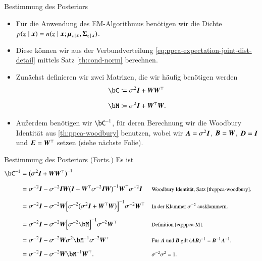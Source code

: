 \begin{frame}{Bestimmung des Posteriors}{}
	\begin{itemize}
		\item Für die Anwendung des EM-Algorithmus benötigen wir die Dichte
			$p(\bm{z} \mid \bm{x}) = n(\bm{z} \mid \bm{x}; \bm{\mu}_{\bm{z}\,\mid\,\bm{x}}, \bm{\Sigma}_{\bm{z}\,\mid\,\bm{x}})$.
		\item Diese können wir aus der Verbundverteilung \eqref{eq:ppca-expectation-joint-dist-detail}
			mittels Satz \ref{th:cond-norm} berechnen.
		\item Zunächst definieren wir zwei Matrizen, die wir häufig benötigen werden
		\begin{align}
		\label{eq:ppca-C}
			\bC
				&\coloneqq \sigma^2 \bI + \bW \bW^\top
		\\[2mm]
		\label{eq:ppca-M}
			\bM
				&\coloneqq \sigma^2 \bI + \bW^\top \bW.
		\end{align}
		\item Außerdem benötigen wir $\bC^{-1}$, für deren Berechnung wir die Woodbury Identität aus \ref{th:ppca-woodbury}
			benutzen, wobei wir $\bm{A} = \sigma^2 \bm{I}$, $\bm{B} = \bm{W}$, $\bm{D} = \bm{I}$ und $\bm{E} = \bm{W}^\top$ setzen
			(siehe nächste Folie).
	\end{itemize}
\end{frame}


\begin{frame}{Bestimmung des Posteriors (Forts.)}{}
	Es ist
	\begin{equation} \label{eq:ppca-C-inv}
		\begin{aligned}
			\bC^{-1}
				&= \bigl( \sigma^2 \bI + \bW \bW^\top \bigr)^{-1}
		\\[2mm]
				&= \sigma^{-2} \bI - \sigma^{-2} \bI \bW \bigl( \bI + \bW^\top \sigma^{-2} \bI \bW \bigr)^{-1}
					\bW^\top \sigma^{-2} \bI
				&& \rem{Woodbury Identität, Satz \ref{th:ppca-woodbury}.}
		\\[2mm]
				&= \sigma^{-2} \bI - \sigma^{-2} \bW \Bigl[ \sigma^{-2} \bigl( \sigma^2 \bI + \bW^\top \bW \bigr) \Bigr]^{-1}
					\sigma^{-2} \bW^\top
				&& \rem{In der Klammer $\sigma^{-2}$ ausklammern.}
		\\[2mm]
				&= \sigma^{-2} \bI - \sigma^{-2} \bW \Bigl[ \sigma^{-2} \bM \Bigr]^{-1} \sigma^{-2} \bW^\top
				&& \rem{Definition \eqref{eq:ppca-M}.}
		\\[2mm]
				&= \sigma^{-2} \bI - \sigma^{-2} \bW \sigma^2 \bM^{-1} \sigma^{-2} \bW^\top
				&& \rem{Für $\bA$ und $\bB$ gilt $(\bA \bB)^{-1} = \bB^{-1} \bA^{-1}$.}
		\\[2mm]
				&= \sigma^{-2} \bI - \sigma^{-2} \bW \bM^{-1} \bW^\top.
				&& \rem{$\sigma^{-2} \sigma^2 = 1$.}
		\end{aligned}
	\end{equation}
\end{frame}


